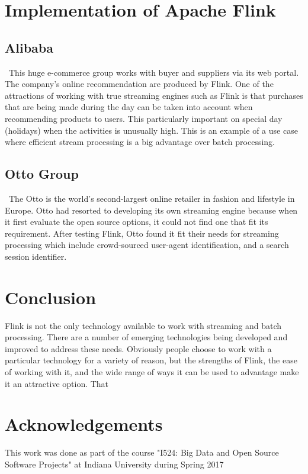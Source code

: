 \documentclass[9pt,twocolumn,twoside]{../../styles/osajnl}
\begin{document}
\section{Implementation of Apache Flink }
\subsection{Alibaba}
~\cite{book-flink}This huge e-commerce group works with buyer and suppliers via its web portal. The company’s online recommendation are produced by Flink. One of the attractions of working with true streaming engines such as Flink is that purchases that are being made during the day can be taken into account when recommending products to users. This particularly important on special day (holidays) when the activities is unusually high. This is an example of a use case where efficient stream processing is a big advantage over batch processing.

\subsection{Otto Group}
~\cite{book-flink}The Otto is the world’s second-largest online retailer in fashion and lifestyle in Europe.  Otto had resorted to developing its own streaming engine because when it first evaluate the open source options, it could not find one that fit its requirement. After testing Flink, Otto found it fit their needs for streaming processing which include crowd-sourced user-agent identification, and a search session identifier.

\section{Conclusion}
Flink is not the only technology available to work with streaming and batch processing. There are a number of emerging technologies being developed and improved to address these needs. Obviously people choose to work with a particular technology for a variety of reason, but the strengths of Flink, the ease of working with it, and the wide range of ways it can be used to advantage make it an attractive option. That

\section{Acknowledgements}
This work was done as part of the course "I524: Big Data and Open Source Software Projects" at Indiana University during Spring 2017



 
\end{document}
